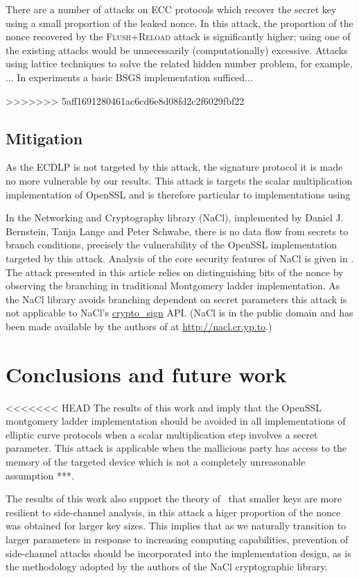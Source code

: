 \documentclass{llncs}
\begin{document}
There are a number of attacks on ECC protocols which recover the secret key using a small proportion of the leaked nonce. In this attack, the proportion of the nonce recovered by the \textsc{Flush+Reload} attack is significantly higher; using one of the existing attacks would be unnecessarily (computationally) excessive. Attacks using lattice techniques to solve the related hidden number problem, for example, ... 
In experiments a basic BSGS implementation sufficed... 


>>>>>>> 5aff1691280461ac6cd6e8d08fd2c2f6029fbf22


\subsection*{Mitigation}
As the ECDLP is not targeted by this attack, the signature protocol it is made no more vulnerable by our results. This attack is targets the scalar multiplication implementation of OpenSSL and is therefore particular to implementations using 

In the Networking and Cryptography library (NaCl), implemented by Daniel J. Bernstein, Tanja Lange and Peter Schwabe, there is no data flow from secrets to branch conditions, precisely the vulnerability of the OpenSSL implementation targeted by this attack. Analysis of the core security features of NaCl is given in \cite{dan-tan-peter} . The attack presented in this article relies on distinguishing bits of the nonce by observing the branching in traditional Montgomery ladder implementation. As the NaCl library avoids branching dependent on secret parameters this attack is not applicable to NaCl's \url{crypto_sign} API. (NaCl is in the public domain and has been made available by the authors of \cite{dan-tan-peter} at \url{http://nacl.cr.yp.to}.)


\section{Conclusions and future work}
<<<<<<< HEAD
The results of this work and \cite{brumley11remote} imply that the OpenSSL montgomery ladder implementation should be avoided in all implementations of elliptic curve protocols when a scalar multiplication step involves a secret parameter. This attack is applicable when the mallicious party has access to the memory of the targeted device which is not a completely unreasonable assumption ***. 

The results of this work also support the theory of~\cite{walter04longer} that smaller keys are more resilient to side-channel analysis, in this attack a higer proportion of the nonce was obtained for larger key sizes. This implies that as we naturally transition to larger parameters in response to increasing computing capabilities, prevention of side-channel attacks should be incorporated into the implementation design, as is the methodology adopted by the authors of the NaCl cryptographic library. 
\end{document}
